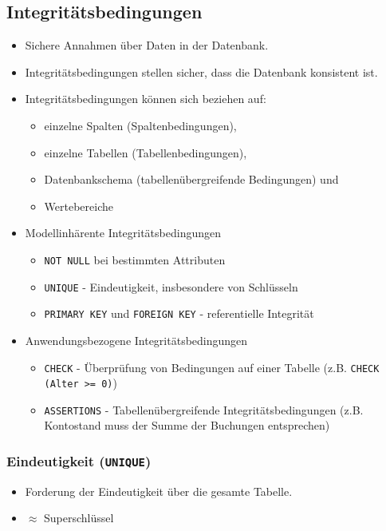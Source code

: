 		\subsection{Integritätsbedingungen} %
			\begin{itemize}
				\item Sichere Annahmen über Daten in der Datenbank.
				\item Integritätsbedingungen stellen sicher, dass die Datenbank konsistent ist.
				\item Integritätsbedingungen können sich beziehen auf:
					\begin{itemize}
						\item einzelne Spalten (Spaltenbedingungen),
						\item einzelne Tabellen (Tabellenbedingungen),
						\item Datenbankschema (tabellenübergreifende Bedingungen) und
						\item Wertebereiche
					\end{itemize}
				\item Modellinhärente Integritätsbedingungen
					\begin{itemize}
						\item \lstinline|NOT NULL| bei bestimmten Attributen
						\item \lstinline|UNIQUE| - Eindeutigkeit, insbesondere von Schlüsseln
						\item \lstinline|PRIMARY KEY| und \lstinline|FOREIGN KEY| - referentielle Integrität
					\end{itemize}
				\item Anwendungsbezogene Integritätsbedingungen
					\begin{itemize}
						\item \lstinline|CHECK| - Überprüfung von Bedingungen auf einer Tabelle (z.B. \lstinline|CHECK (Alter >= 0)|)
						\item \lstinline|ASSERTIONS| - Tabellenübergreifende Integritätsbedingungen (z.B. Kontostand muss der Summe der Buchungen entsprechen)
					\end{itemize}
			\end{itemize}

			\subsubsection{Eindeutigkeit (\lstinline|UNIQUE|)} %
				\begin{itemize}
					\item Forderung der Eindeutigkeit über die gesamte Tabelle.
					\item[] \( \approx \) Superschlüssel
				\end{itemize}

